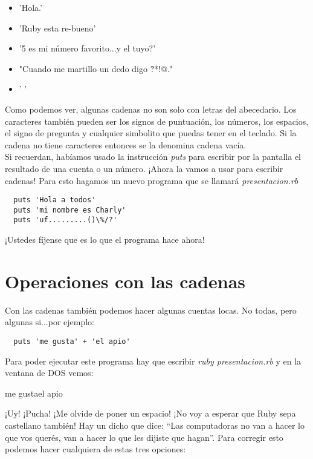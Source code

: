 \begin{itemize}
  \item 'Hola.'
  \item 'Ruby esta re-bueno'
  \item '5 es mi número favorito...y el tuyo?'
  \item "Cuando me martillo un dedo digo \^?*!@."
  \item ' '
\end{itemize}

Como podemos ver, algunas cadenas no son solo con letras del abecedario. Los caracteres también pueden ser los signos de puntuación, los números, los espacios, el signo de pregunta y cualquier simbolito que puedas tener en el teclado. Si la cadena no tiene caracteres entonces se la denomina cadena vacía.\\

Si recuerdan, habíamos usado la instrucción \emph{puts} para escribir por la pantalla el resultado de una cuenta o un número. ¡Ahora la vamos a usar para escribir cadenas! Para esto hagamos un nuevo programa que se llamará \emph{presentacion.rb}


\begin{lstlisting}
  puts 'Hola a todos'
  puts 'mi nombre es Charly'
  puts 'uf.........()\%/?'
\end{lstlisting}

¡Ustedes fíjense que es lo que el programa hace ahora!

\section{Operaciones con las cadenas}

Con las cadenas también podemos hacer algunas cuentas locas. No todas, pero algunas si...por ejemplo:

\begin{lstlisting}
  puts 'me gusta' + 'el apio'
\end{lstlisting}

Para poder ejecutar este programa hay que escribir \emph{ruby presentacion.rb} y en la ventana de DOS vemos:
\begin{console-output}
  me gustael apio
\end{console-output}

¡Uy! ¡Pucha! ¡Me olvide de poner un espacio! ¡No voy a esperar que Ruby sepa castellano también! Hay un dicho que dice: “Las computadoras no van a hacer lo que vos querés, van a hacer lo que les dijiste que hagan”. Para corregir esto podemos hacer cualquiera de estas tres opciones:

